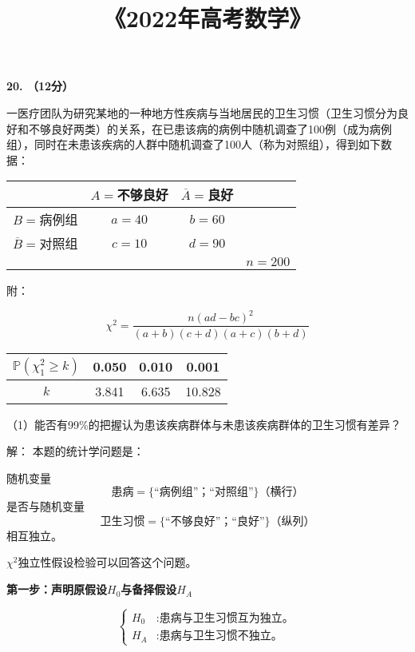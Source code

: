 \documentclass[a4paper,12pt]{article}
\title{《2022年高考数学》}
\date{}
\newcommand{\p}[1]{\mathbb{P}\left(#1\right)}
\renewcommand{\bar}[1]{\overline{#1}}
\begin{document}
\maketitle

\setcounter{section}{19}

\textbf{20. （12分）}

一医疗团队为研究某地的一种地方性疾病与当地居民的卫生习惯（卫生习惯分为良好和不够良好两类）的关系，在已患该病的病例中随机调查了100例（成为病例组），同时在未患该疾病的人群中随机调查了100人（称为对照组），得到如下数据：
\begin{center}
    \begin{tabular}{c c c c}
    \hline
                & $A=$不够良好 & $\bar{A}=$良好 & \\
    \hline
        $B=$病例组  & $a = 40$    & $b = 60$ & \\
        $\bar{B}=$对照组  & $c = 10$    & $d = 90$ & \\
    \hline
        & & & $n = 200$
    \end{tabular}
\end{center}

附：

\[ \chi^2 = \frac{n(ad - bc)^2}{(a+b)(c+d)(a+c)(b+d)} \]

\begin{center}
    \begin{tabular}{c | c c c}
        $\p{\chi^2_1 \geq k}$ & 0.050 & 0.010 & 0.001\\
    \hline
        $k$  & 3.841 & 6.635 & 10.828\\
    \end{tabular}
\end{center}

\newpage

（1）能否有99\%的把握认为患该疾病群体与未患该疾病群体的卫生习惯有差异？

\color{blue}
解：
本题的统计学问题是：

随机变量
$$\text{患病}=\{\text{“病例组”；}\text{“对照组”}\}（横行）$$
是否与随机变量
$$\text{卫生习惯}=\{\text{“不够良好”；}\text{“良好”}\}（纵列）$$
相互独立。

$\chi^2$独立性假设检验可以回答这个问题。

\textbf{第一步：声明原假设$H_0$与备择假设$H_A$}

\begin{equation*}
    \left\{
        \begin{aligned}
            H_0 &: \text{患病与卫生习惯互为独立。} \\
            H_A &: \text{患病与卫生习惯不独立。}
        \end{aligned}
    \right.
\end{equation*}
\end{document}
